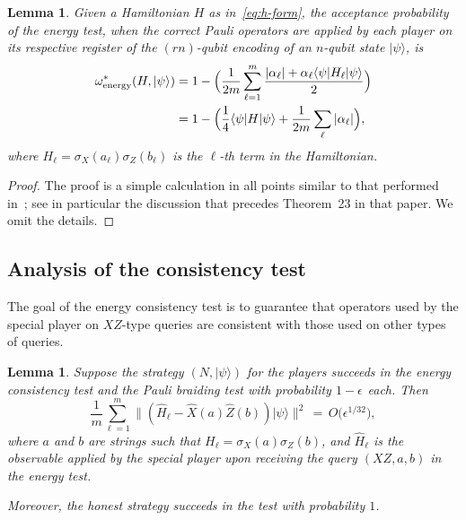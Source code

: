 \documentclass[11pt,letterpaper]{article}
\newcommand{\<}{\langle}
\renewcommand{\>}{\rangle}
\newtheorem{lemma}[theorem]{Lemma}
\newcommand{\bra}[1]{\< #1 |}
\newcommand{\ket}[1]{| #1 \>}
\newcommand{\eps}{\epsilon}
\newcommand{\energy}{\ensuremath{\rm energy}}
\renewcommand{\sp}{\hat{H}}
\begin{document}
\begin{lemma}
Given a Hamiltonian $H$ as in~\eqref{eq:h-form}, the acceptance probability of the energy test, when the correct Pauli operators are applied by each player on its respective register of the $(rn)$-qubit encoding of an $n$-qubit state $\ket{\psi}$, is
\begin{align*}
\omega^*_{\energy}(H,\ket{\psi}) &= 1-\Big( \frac{1}{2m} \sum_{\ell = 1}^{m} \frac{ |\alpha_{\ell} | +
  \alpha_{\ell} \langle \psi|H_\ell |\psi \rangle}{2} \Big)\\
  &= 1-\Big(\frac{1}{4}\bra{\psi} H\ket{\psi} + \frac{1}{2m }
    \sum_{\ell} |\alpha_{\ell}|\Big),
\end{align*}
where $H_\ell = \sigma_X(a_\ell)\sigma_Z(b_\ell)$ is the $\ell$-th term in the Hamiltonian.
\label{lem:energy_test}
\end{lemma}

\begin{proof}
The proof is a simple calculation in all points similar to that performed in~\cite[Section~4]{ji2015classical}; see in particular the discussion that precedes Theorem~23 in that paper. We omit the details.
\end{proof}

\subsection{Analysis of the consistency test}
\label{sec:consistencytest}

The goal of the energy consistency test is to guarantee that operators used by the special player on $XZ$-type queries are consistent with those used on other types of queries. 

\begin{lemma}
  Suppose the strategy $(N,\ket{\psi})$ for the players succeeds in the energy consistency test and the Pauli braiding test with probability $1 -
  \eps_{}$ each. Then 
  \[\frac{1}{m}\sum_{\ell=1}^m \big
	\| (\sp_\ell - \hat{X}(a)\hat{Z}(b))\ket{\psi}\big\|^2 \,=\,
  O\big(\eps_{}^{1/32}\big), \]
where $a$ and $b$ are strings such that $H_\ell = \sigma_X(a)\sigma_Z(b)$, and $\sp_\ell$ is the observable applied by the special player upon receiving the query $(XZ, a,  b)$ in the energy test. 
 
Moreover, the honest strategy succeeds in the test with probability $1$. 
\label{lem:energy_consistency}
\end{lemma}
\end{document}
